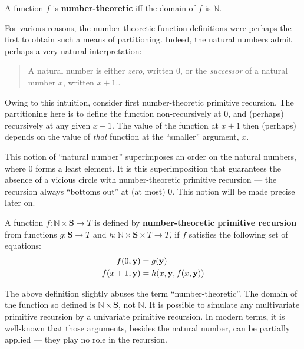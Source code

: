 \begin{definition} A function $f$ is \textbf{number-theoretic} iff the domain
of $f$ is $\mathbb{N}$. \end{definition}

For various reasons, the number-theoretic function definitions were perhaps the
first to obtain such a means of partitioning. Indeed, the natural numbers admit
perhaps a very natural interpretation:

\begin{quote}

A natural number is either \emph{zero}, written $0$, or the \emph{successor} of
a natural number $x$, written $x+1$.\cite{dedekind-1888, rose-1984,
odifreddi-1989}.

\end{quote}


Owing to this intuition, consider first number-theoretic primitive recursion.
The partitioning here is to define the function non-recursively at $0$, and
(perhaps) recursively at any given $x+1$. The value of the function at $x+1$
then (perhaps) depends on the value of \emph{that} function at the ``smaller''
argument, $x$.

This notion of ``natural number'' superimposes an order on the natural numbers,
where $0$ forms a least element. It is this superimposition that guarantees the
absence of a vicious circle with number-theoretic primitive recursion --- the
recursion always ``bottoms out'' at (at most) $0$. This notion will be made
precise later on.

\begin{definition} \label{def:number-theoretic-primitive-recursion} A function
$f : \mathbb{N} \times \mathbf{S} \rightarrow T$ is defined by
\textbf{number-theoretic primitive recursion} from functions $g : \mathbf{S}
\rightarrow T$ and $h : \mathbb{N} \times \mathbf{S} \times T \rightarrow T$,
if $f$ satisfies the following set of equations:\begin{align*}
%
f\p{0, \mathbf{y}} &= g\p{\mathbf{y}}\\
%
f\p{x+1, \mathbf{y}} &= h\p{x,\mathbf{y},f\p{x,\mathbf{y}}}
%
\end{align*}\end{definition}

\begin{remark} The above definition slightly abuses the term
``number-theoretic''. The domain of the function so defined is $\mathbb{N}
\times \mathbf{S}$, not $\mathbb{N}$. It is possible to simulate any
multivariate primitive recursion by a univariate primitive
recursion\cite{rose-1984}.  In modern terms, it is well-known that those
arguments, besides the natural number, can be partially applied --- they play
no role in the recursion.  \end{remark}

